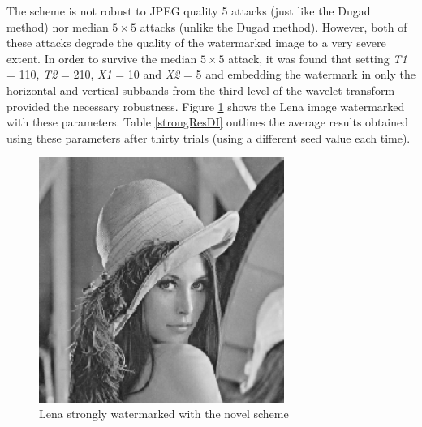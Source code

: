 \documentclass[12pt]{report}
\begin{document}
The scheme is not robust
to JPEG quality 5 attacks (just like the Dugad method) nor median $5 \times 5$ attacks
(unlike the Dugad method). However, both of these
attacks degrade the quality of the watermarked image to a very severe extent.
In order to survive the median $5 \times 5$ attack, it was found that setting 
\emph{T1} = 110, \emph{T2} = 210, \emph{X1} = 10 and \emph{X2} = 5 and
embedding the watermark in only the horizontal and vertical subbands from the third
level of the wavelet transform 
provided the necessary robustness. 
Figure \ref{lenaNewStrongDI} shows the Lena image watermarked with these parameters.
Table \ref{strongResDI} outlines the average results
obtained using these parameters after thirty trials (using a different seed value each time). 
\begin{figure}[!ht]
	\begin{center}
		\includegraphics[height=8cm,width=8cm]{IM_strongMed5x5Seed100Lena.ps}
		\caption{Lena strongly watermarked with the novel scheme}
		\label{lenaNewStrongDI}
	\end{center}
\end{figure}
\end{document}
